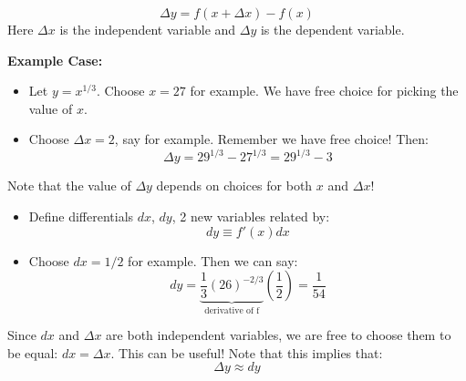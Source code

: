 \begin{itemize}
\begin{multicols}{2}
\begin{itemize}
\begin{equation}
            \Delta y = f(x+\Delta x)-f(x)
            \label{eq:}
        \end{equation}
        Here $\Delta x$ is the independent variable and $\Delta y$ is the dependent variable.
    \end{itemize}
    \vfill\null
    \columnbreak
    \textbf{Example Case:}
    \begin{itemize}
        \item Let $y=x^{1/3}$. Choose $x=27$ for example. We have free choice for picking the value of $x$.
        \item Choose $\Delta x=2$, say for example. Remember we have free choice! Then:
        \begin{equation}
            \Delta y = 29^{1/3}-27^{1/3}=29^{1/3}-3
            \label{eq:}
        \end{equation}
    \end{itemize}
\end{multicols}
\begin{idea}
    Note that the value of $\Delta y$ depends on choices for both $x$ and $\Delta x$!
\end{idea}
\begin{multicols}{2}
    \begin{itemize}
        \item Define differentials $dx$, $dy$, 2 new variables related by:
        \begin{equation}
            dy \equiv f'(x) dx
            \label{eq:}
        \end{equation}
    \end{itemize}
    \vfill\null
    \columnbreak
    \begin{itemize}
        \item Choose $dx=1/2$ for example. Then we can say:
        \begin{equation}
            dy=\underbrace{\frac{1}{3}(26)^{-2/3}}_\text{derivative of f}\left(\frac{1}{2}\right)=\frac{1}{54}
            \label{eq:}
        \end{equation}
    \end{itemize}
\end{multicols}
\begin{idea}
    Since $dx$ and $\Delta x$ are both independent variables, we are free to choose them to be equal: $dx=\Delta x$. This can be useful! Note that this implies that:
    \begin{equation}
        \Delta y \approx dy
        \label{eq:}
    \end{equation}

\end{idea}
\end{itemize}
